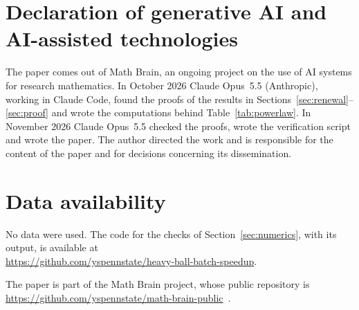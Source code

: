 \documentclass[11pt]{amsart}
\theoremstyle{definition}
\theoremstyle{remark}
\numberwithin{equation}{section}
\begin{document}
\section*{Declaration of generative AI and AI-assisted technologies}
The paper comes out of Math Brain, an ongoing project on the use of AI systems for research mathematics. In October 2026 Claude Opus~5.5 (Anthropic), working in Claude Code, found the proofs of the results in Sections~\ref{sec:renewal}--\ref{sec:proof} and wrote the computations behind Table~\ref{tab:powerlaw}. In November 2026 Claude Opus~5.5 checked the proofs, wrote the verification script and wrote the paper. The author directed the work and is responsible for the content of the paper and for decisions concerning its dissemination.

\section*{Data availability}
No data were used. The code for the checks of Section~\ref{sec:numerics}, with its output, is available at\\ \url{https://github.com/yspennstate/heavy-ball-batch-speedup}.

The paper is part of the Math Brain project, whose public repository is \url{https://github.com/yspennstate/math-brain-public}~\cite{MathBrainRepo}.
\end{document}
